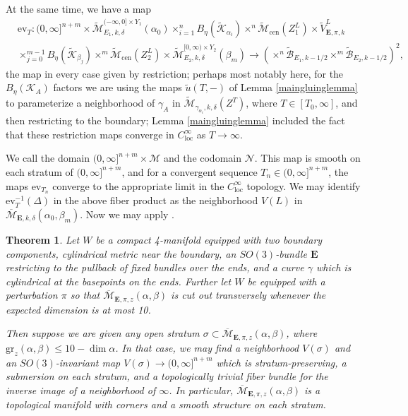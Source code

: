 \documentclass{memo-l}
\newtheorem{theorem}{Theorem}[chapter]
\theoremstyle{definition}
\theoremstyle{remark}
\numberwithin{section}{chapter}
\numberwithin{equation}{chapter}
\begin{document}
At the same time, we have a map \begin{align*}&\text{ev}_T: (0,\infty]^{n+m} \times \widetilde{\mathcal M}_{E_1, k,\delta}^{(-\infty, 0] \times Y_1}(\alpha_0) \times_{i=1}^n B_\eta(\widetilde{\mathcal K}_{\alpha_i})\times^n \widetilde{\mathcal M}_{\text{cen}}(Z^L_1) \times \widetilde V^L_{\mathbf{E},\pi,k}\\
&\times_{j=0}^{m-1} B_\eta(\widetilde{\mathcal K}_{\beta_j}) \times^m \widetilde{\mathcal M}_{\text{cen}}(Z^L_2) \times \widetilde{\mathcal M}_{E_2,k,\delta}^{[0,\infty) \times Y_2}(\beta_m) \to \left(\times^n\widetilde{\mathcal B}_{E_1,k-1/2} \times^m \widetilde{\mathcal B}_{E_2, k-1/2}\right)^2,\end{align*} the map in every case given by restriction; perhaps most notably here, for the $B_\eta(\mathcal K_A)$ factors we are using the maps $\widetilde u(T, -)$ of Lemma \ref{maingluinglemma} to parameterize a neighborhood of $\gamma_A$ in $\widetilde{\mathcal M}_{\gamma_{\alpha_i},k,\delta}(Z^T)$, where $T \in [T_0, \infty]$, and then restricting to the boundary; Lemma \ref{maingluinglemma} included the fact that these restriction maps converge in $C^\infty_{\text{loc}}$ as $T \to \infty$.

We call the domain $(0,\infty]^{n+m} \times \mathcal M$ and the codomain $\mathcal N$. This map is smooth on each stratum of $(0, \infty]^{n+m}$, and for a convergent sequence $T_n \in (0,\infty]^{n+m}$, the maps $\text{ev}_{T_n}$ converge to the appropriate limit in the $C^\infty_{\text{loc}}$ topology. We may identify $\text{ev}_T^{-1}(\Delta)$ in the above fiber product as the neighborhood $V(L)$ in $\overline{\mathcal M}_{\mathbf{E},k,\delta}(\alpha_0, \beta_m)$. Now we may apply \cite[Lemma~19.3.3]{KMSW}.

\begin{theorem}\label{gluing-end}Let $W$ be a compact 4-manifold equipped with two boundary components, cylindrical metric near the boundary, an $SO(3)$-bundle $\mathbf{E}$ restricting to the pullback of fixed bundles over the ends, and a curve $\gamma$ which is cylindrical at the basepoints on the ends. Further let $W$ be equipped with a perturbation $\pi$ so that $\overline{\mathcal M}_{\mathbf{E}, \pi, z}(\alpha, \beta)$ is cut out transversely whenever the expected dimension is at most 10.

Then suppose we are given any open stratum $\sigma \subset \overline{\mathcal M}_{\mathbf{E}, \pi, z}(\alpha, \beta)$, where $\text{gr}_z(\alpha, \beta) \leq 10 - \dim \alpha$. In that case, we may find a neighborhood $V(\sigma)$ and an $SO(3)$-invariant map $V(\sigma) \to (0,\infty]^{n+m}$ which is stratum-preserving, a submersion on each stratum, and a topologically trivial fiber bundle for the inverse image of a neighborhood of $\infty$. In particular, $\overline{\mathcal M}_{\mathbf{E}, \pi, z}(\alpha, \beta)$ is a topological manifold with corners and a smooth structure on each stratum.
\end{theorem}
\end{document}

